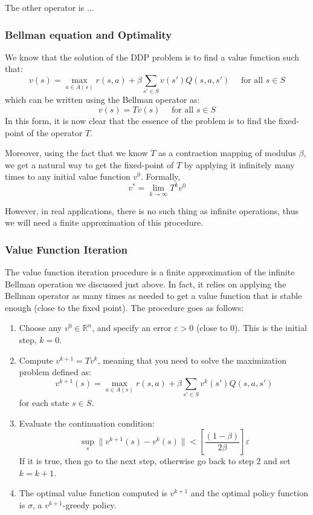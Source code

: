 The other operator is ...

\subsubsection{Bellman equation and Optimality}

We know that the solution of the DDP problem is to find a value function such that: $$ v(s) = \max_{a\in A(s)} r(s, a) + \beta\sum_{s'\in S} v(s')Q(s, a, s') \quad \text{ for all } s\in S $$ which can be written using the Bellman operator as: $$ v(s) = Tv(s) \quad \text{ for all } s\in S $$
In this form, it is now clear that the essence of the problem is to find the fixed-point of the operator $T$. 

Moreover, using the fact that we know $T$ as a contraction mapping of modulus $\beta$, we get a natural way to get the fixed-point of $T$ by applying it infinitely many times to any initial value function $v^0$. Formally, $$v^* = \lim_{k\to\infty} T^{k} v^0 $$

However, in real applications, there is no such thing as infinite operations, thus we will need a finite approximation of this procedure.

\subsubsection{Value Function Iteration}

The value function iteration procedure is a finite approximation of the infinite Bellman operation we discussed just above. In fact, it relies on applying the Bellman operator as many times as needed to get a value function that is stable enough (close to the fixed point). The procedure goes as follows:\begin{enumerate}
\item Choose any $v^0 \in \mathbb{R}^n$, and specify an error $\varepsilon > 0$ (close to 0). This is the initial step, $k =0$.
\item Compute $v^{k+1} = T v^k$, meaning that you need to solve the maximization problem defined as: $$ v^{k+1}(s) = \max_{a\in A(s)} r(s, a) + \beta\sum_{s'\in S} v^k(s')Q(s, a, s') $$ for each state $s\in S$.
\item Evaluate the continuation condition: $$ \sup_s \lVert v^{k+1}(s) - v^{k}(s) \rVert < \left[\frac{(1-\beta)}{2\beta}\right]\varepsilon $$ If it is true, then go to the next step, otherwise go back to step 2 and set $k = k+1$.
\item The optimal value function computed is $v^{k+1}$ and the optimal policy function is $\sigma$, a $v^{k+1}$-greedy policy.
\end{enumerate}


